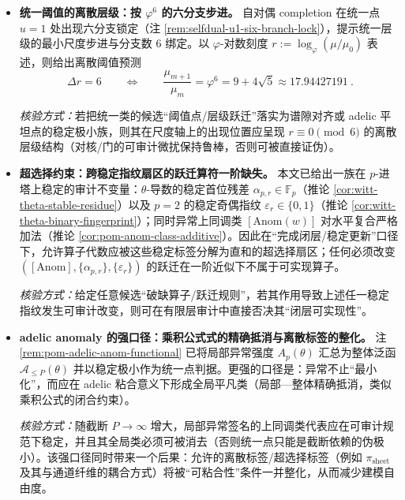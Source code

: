 \begin{itemize}
  \item \textbf{统一阈值的离散层级：按 \(\varphi^6\) 的六分支步进。}
  自对偶 completion 在统一点 \(u=1\) 处出现六分支锁定（注 \ref{rem:selfdual-u1-six-branch-lock}），提示统一层级的最小尺度步进与分支数 \(6\) 绑定。以 \(\varphi\)-对数刻度 \(r:=\log_{\varphi}(\mu/\mu_0)\) 表述，则给出离散阈值预测
  \[
  \boxed{\ \Delta r=6\qquad\Longleftrightarrow\qquad \frac{\mu_{m+1}}{\mu_m}=\varphi^6=9+4\sqrt5\approx 17.94427191\ }.
  \]
  \par\noindent\emph{核验方式：}若把统一类的候选“阈值点/层级跃迁”落实为谱隙对齐或 adelic 平坦点的稳定极小族，则其在尺度轴上的出现位置应呈现 \(r\equiv 0\pmod 6\) 的离散层级结构（对核/门的可审计微扰保持鲁棒，否则可被直接证伪）。

  \item \textbf{超选择约束：跨稳定指纹扇区的跃迁算符一阶缺失。}
  本文已给出一族在 \(p\)-进塔上稳定的审计不变量：\(\theta\)-导数的稳定首位残差 \(\alpha_{p,r}\in\mathbb{F}_p\)（推论 \ref{cor:witt-theta-stable-residue}）以及 \(p=2\) 的稳定奇偶指纹 \(\varepsilon_r\in\{0,1\}\)（推论 \ref{cor:witt-theta-binary-fingerprint}）；同时异常上同调类 \([\mathrm{Anom}(w)]\) 对水平复合严格加法（推论 \ref{cor:pom-anom-class-additive}）。因此在“完成闭层/稳定更新”口径下，允许算子代数应被这些稳定标签分解为直和的超选择扇区；任何必须改变 \(([\mathrm{Anom}],\{\alpha_{p,r}\},\{\varepsilon_r\})\) 的跃迁在一阶近似下不属于可实现算子。
  \par\noindent\emph{核验方式：}给定任意候选“破缺算子/跃迁规则”，若其作用导致上述任一稳定指纹发生可审计改变，则可在有限层审计中直接否决其“闭层可实现性”。

  \item \textbf{adelic anomaly 的强口径：乘积公式式的精确抵消与离散标签的整化。}
  注 \ref{rem:pom-adelic-anom-functional} 已将局部异常强度 \(A_p(\theta)\) 汇总为整体泛函 \(\mathcal{A}_{\le P}(\theta)\) 并以稳定极小作为统一点判据。更强的口径是：异常不止“最小化”，而应在 adelic 粘合意义下形成全局平凡类（局部—整体精确抵消，类似乘积公式的闭合约束）。
  \par\noindent\emph{核验方式：}随截断 \(P\to\infty\) 增大，局部异常签名的上同调类代表应在可审计规范下稳定，并且其全局类必须可被消去（否则统一点只能是截断依赖的伪极小）。该强口径同时带来一个后果：允许的离散标签/超选择标签（例如 \(\pi_{\mathrm{sheet}}\) 及其与通道纤维的耦合方式）将被“可粘合性”条件一并整化，从而减少建模自由度。


\end{itemize}
